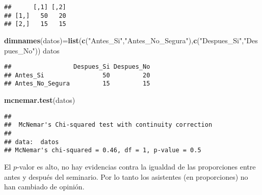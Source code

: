 \documentclass[
]{article}
\newenvironment{Shaded}{\begin{snugshade}}{\end{snugshade}}
\newcommand{\KeywordTok}[1]{\textcolor[rgb]{0.13,0.29,0.53}{\textbf{#1}}}
\newcommand{\NormalTok}[1]{#1}
\newcommand{\StringTok}[1]{\textcolor[rgb]{0.31,0.60,0.02}{#1}}
\begin{document}
\begin{verbatim}
##      [,1] [,2]
## [1,]   50   20
## [2,]   15   15
\end{verbatim}

\begin{Shaded}
\begin{Highlighting}[]
\KeywordTok{dimnames}\NormalTok{(datos)=}\KeywordTok{list}\NormalTok{(}\KeywordTok{c}\NormalTok{(}\StringTok{"Antes\_Si"}\NormalTok{,}\StringTok{"Antes\_No\_Segura"}\NormalTok{),}\KeywordTok{c}\NormalTok{(}\StringTok{"Despues\_Si"}\NormalTok{,}\StringTok{"Despues\_No"}\NormalTok{))}
\NormalTok{datos}
\end{Highlighting}
\end{Shaded}

\begin{verbatim}
##                 Despues_Si Despues_No
## Antes_Si                50         20
## Antes_No_Segura         15         15
\end{verbatim}

\begin{Shaded}
\begin{Highlighting}[]
\KeywordTok{mcnemar.test}\NormalTok{(datos)}
\end{Highlighting}
\end{Shaded}

\begin{verbatim}
## 
##  McNemar's Chi-squared test with continuity correction
## 
## data:  datos
## McNemar's chi-squared = 0.46, df = 1, p-value = 0.5
\end{verbatim}

El \(p\)-valor es alto, no hay evidencias contra la igualdad de las
proporciones entre antes y después del seminario. Por lo tanto los
asistentes (en proporciones) no han cambiado de opinión.
\end{document}
